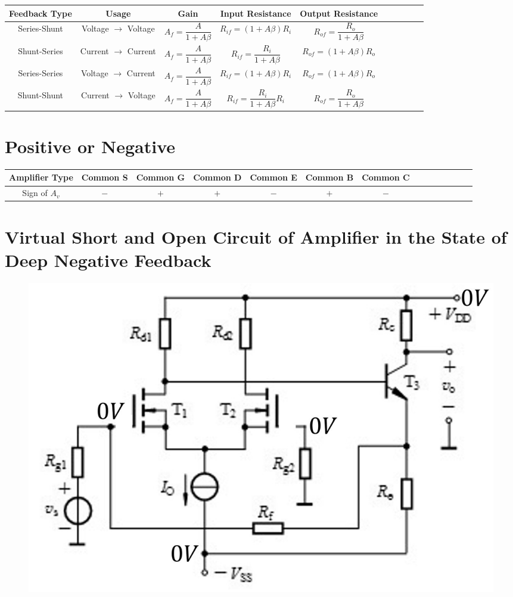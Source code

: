 \begin{table}[h]
  \centering
  \begin{tabular}{|Sc|Sc|Sc|Sc|Sc|}
    \hline
    Feedback Type & Usage & Gain & Input Resistance & Output Resistance \\
    \hline
    Series-Shunt & Voltage $\rightarrow$ Voltage & $A_f = \dfrac{A}{1 + A \beta} $ & $ R_{if} = \left( 1 + A \beta \right) R_i$ & $R_{of} = \dfrac{R_o}{1 + A \beta} $ \\
    \hline
    Shunt-Series & Current $\rightarrow$ Current & $A_f = \dfrac{A}{1 + A \beta} $ & $ R_{if} = \dfrac{R_i}{1 + A \beta} $ & $R_{of} = \left( 1 + A \beta \right) R_o $ \\
    \hline
    Series-Series & Voltage $\rightarrow$ Current & $A_f = \dfrac{A}{1 + A \beta} $ & $ R_{if} = \left( 1 + A \beta \right) R_i$ & $R_{of} = \left( 1 + A \beta \right) R_o $ \\
    \hline
    Shunt-Shunt & Current $\rightarrow$ Voltage & $A_f = \dfrac{A}{1 + A \beta} $ & $ R_{if} = \dfrac{R_i}{1 + A \beta}  R_i$ & $R_{of} = \dfrac{R_o}{1 + A \beta} $ \\
    \hline
  \end{tabular}
\end{table}

\section{Positive or Negative}

\begin{table}[h]
  \centering
  \begin{tabular}{|Sc|Sc|Sc|Sc|Sc|Sc|Sc|}
    \hline
    Amplifier Type & Common S & Common G & Common D & Common E & Common B & Common C \\
    \hline
    Sign of $A_v$ & $-$ & $+$ & $+$ & $-$ & $+$ & $-$ \\
    \hline
  \end{tabular}
\end{table}

\section{Virtual Short and Open Circuit of Amplifier in the State of Deep Negative Feedback}

\begin{figure}[H]
  \centering
  \includegraphics[width=0.9\linewidth]{figures/Feedback-Virtual-Short-Open-Circuit}
\end{figure}

